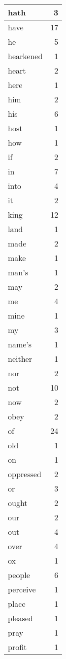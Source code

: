 \begin{center}
\begin{longtable}{l|r}
hath & 3 \\ \hline
have & 17 \\ \hline
he & 5 \\ \hline
hearkened & 1 \\ \hline
heart & 2 \\ \hline
here & 1 \\ \hline
him & 2 \\ \hline
his & 6 \\ \hline
host & 1 \\ \hline
how & 1 \\ \hline
if & 2 \\ \hline
in & 7 \\ \hline
into & 4 \\ \hline
it & 2 \\ \hline
king & 12 \\ \hline
land & 1 \\ \hline
made & 2 \\ \hline
make & 1 \\ \hline
man's & 1 \\ \hline
may & 2 \\ \hline
me & 4 \\ \hline
mine & 1 \\ \hline
my & 3 \\ \hline
name's & 1 \\ \hline
neither & 1 \\ \hline
nor & 2 \\ \hline
not & 10 \\ \hline
now & 2 \\ \hline
obey & 2 \\ \hline
of & 24 \\ \hline
old & 1 \\ \hline
on & 1 \\ \hline
oppressed & 2 \\ \hline
or & 3 \\ \hline
ought & 2 \\ \hline
our & 2 \\ \hline
out & 4 \\ \hline
over & 4 \\ \hline
ox & 1 \\ \hline
people & 6 \\ \hline
perceive & 1 \\ \hline
place & 1 \\ \hline
pleased & 1 \\ \hline
pray & 1 \\ \hline
profit & 1 \\ \hline

\end{longtable}
\end{center}
